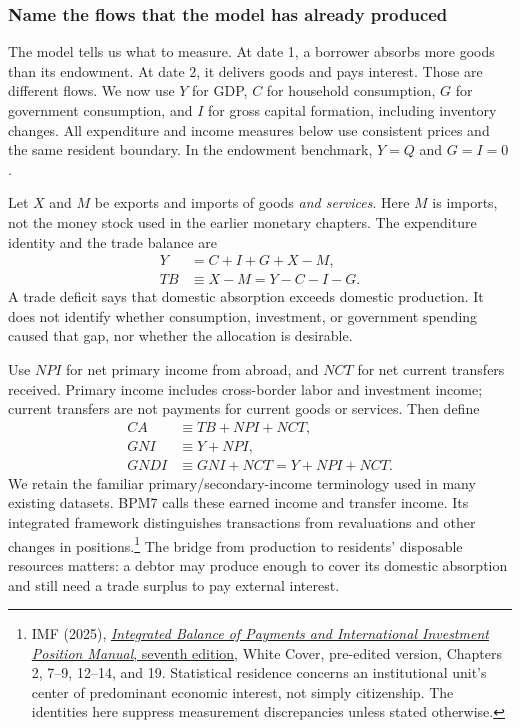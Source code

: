\subsubsection{Name the flows that the model has already produced}

The model tells us what to measure. At date 1, a borrower absorbs more goods
than its endowment. At date 2, it delivers goods and pays interest. Those are
different flows. We now use $Y$ for GDP, $C$ for household consumption, $G$
for government consumption, and $I$ for gross capital formation, including
inventory changes. All expenditure and income measures below use consistent
prices and the same resident boundary. In the endowment benchmark, $Y=Q$
and $G=I=0$.

Let $X$ and $M$ be exports and imports of goods \emph{and services}. Here $M$
is imports, not the money stock used in the earlier monetary chapters. The
expenditure identity and the trade balance are
\begin{align}
 Y&=C+I+G+X-M,\\
 TB&\equiv X-M=Y-C-I-G.\label{eq:open-trade-balance}
\end{align}
A trade deficit says that domestic absorption exceeds domestic production.
It does not identify whether consumption, investment, or government spending
caused that gap, nor whether the allocation is desirable.

Use $NPI$ for net primary income from abroad, and $NCT$ for net current
transfers received. Primary income includes cross-border labor and investment
income; current transfers are not payments for current goods or services.
Then define
\begin{align}
 CA&\equiv TB+NPI+NCT,\label{eq:open-current-account}\\
 GNI&\equiv Y+NPI,\\
 GNDI&\equiv GNI+NCT=Y+NPI+NCT.
\end{align}
We retain the familiar primary/secondary-income terminology used in many
existing datasets. BPM7 calls these earned income and transfer income.
Its integrated framework distinguishes transactions from revaluations and
other changes in positions.\footnote{IMF (2025),
\href{https://data.imf.org/-/media/iData/External-Storage/Documents/5B776E0E552E4881AF24042EAE7D049B/en/1-BPM7-White-Cover.pdf}{\textit{Integrated Balance of Payments and International Investment Position
Manual}, seventh edition}, White Cover, pre-edited version, Chapters 2,
7--9, 12--14, and 19. Statistical residence concerns an institutional unit's
center of predominant economic interest, not simply citizenship. The
identities here suppress measurement discrepancies unless stated otherwise.}
The bridge from production to residents' disposable resources matters:
a debtor may produce enough to cover its domestic absorption and still need
a trade surplus to pay external interest.

